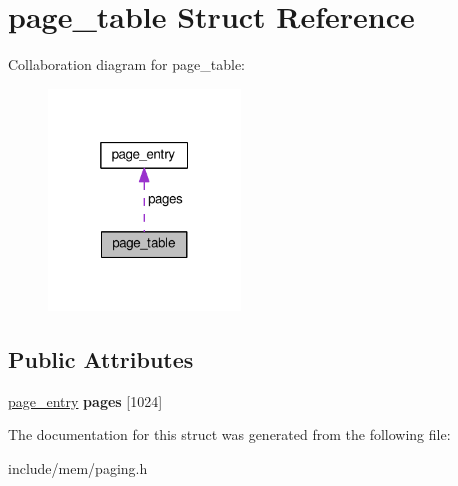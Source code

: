 \hypertarget{structpage__table}{}\section{page\+\_\+table Struct Reference}
\label{structpage__table}


Collaboration diagram for page\+\_\+table\+:
\nopagebreak
\begin{figure}[H]
\begin{center}
\leavevmode
\includegraphics[width=145pt]{structpage__table__coll__graph}
\end{center}
\end{figure}
\subsection*{Public Attributes}
\begin{DoxyCompactItemize}
\item 
\hyperlink{structpage__entry}{page\+\_\+entry} {\bfseries pages} \mbox{[}1024\mbox{]}\hypertarget{structpage__table_aa066e0fa847ce2fafb6a2feddfa340ff}{}\label{structpage__table_aa066e0fa847ce2fafb6a2feddfa340ff}

\end{DoxyCompactItemize}


The documentation for this struct was generated from the following file\+:\begin{DoxyCompactItemize}
\item 
include/mem/paging.\+h\end{DoxyCompactItemize}
